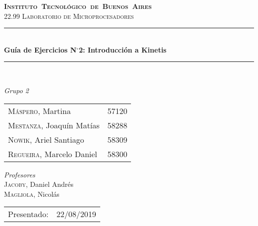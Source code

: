 \begin{titlepage}
\newcommand{\HRule}{\rule{\linewidth}{0.5mm}}
\center
\mbox{\textsc{\LARGE \bfseries {Instituto Tecnol\'ogico de Buenos Aires}}}\\[1.5cm]
\textsc{\Large 22.99 Laboratorio de Microprocesadores}\\[0.5cm]


\HRule \\[0.6cm]
{ \Huge \bfseries Guía de Ejercicios N$^{\circ}$2: Introducción a Kinetis}\\[0.4cm] %
\HRule \\[1.5cm]


{\large

\emph{Grupo 2}\\
\vspace{3px}

\begin{tabular}{lr} 	
\textsc{M\'aspero}, Martina  & 57120 \\
\textsc{Mestanza}, Joaqu\'in Mat\'ias  & 58288 \\
\textsc{Nowik}, Ariel Santiago  & 58309 \\
\textsc{Regueira}, Marcelo Daniel  & 58300 \\
\end{tabular}

\vspace{20px}

\emph{Profesores}\\
\vspace{3px}
\textsc{Jacoby}, Daniel Andr\'es\\ 	
\textsc{Magliola}, Nicol\'as\\ 	

\vspace{100px}

\begin{tabular}{ll}

Presentado: & 22/08/2019\\

\end{tabular}

}

\vfill

\end{titlepage}